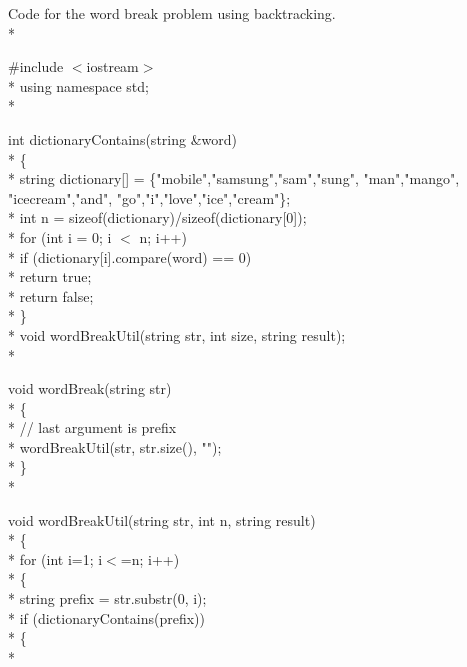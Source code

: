 \documentclass[12pt]{book}
\begin{document}
 Code for the word break problem using backtracking.\\*
 
 
$\#$include $<$iostream$>$\\*
using namespace std;\\*

int dictionaryContains(string \&word)\\*
\{\\*
\phantom{x} \hspace{3ex}    string dictionary[] = \{"mobile","samsung","sam","sung",
                            "man","mango", "icecream","and",
                            "go","i","love","ice","cream"\};\\*
\phantom{x} \hspace{3ex}    int n = sizeof(dictionary)/sizeof(dictionary[0]);\\*
\phantom{x} \hspace{3ex}    for (int i = 0; i $<$ n; i++)\\*
\phantom{x} \hspace{3ex} \phantom{x} \hspace{3ex}       if (dictionary[i].compare(word) == 0)\\*
\phantom{x} \hspace{3ex} \phantom{x} \hspace{3ex} \phantom{x} \hspace{3ex}          return true;\\*
\phantom{x} \hspace{3ex}    return false;\\*
\}\\*
void wordBreakUtil(string str, int size, string result);\\*

void wordBreak(string str)\\*
\{\\*
\phantom{x} \hspace{3ex}    // last argument is prefix\\*
\phantom{x} \hspace{3ex}    wordBreakUtil(str, str.size(), "");\\*
\}\\*

void wordBreakUtil(string str, int n, string result)\\*
\{\\*
\phantom{x} \hspace{3ex}    for (int i=1; i$<$=n; i++)\\*
 \phantom{x} \hspace{3ex}   \{\\*
\phantom{x} \hspace{3ex} \phantom{x} \hspace{3ex}       string prefix = str.substr(0, i);\\*
\phantom{x} \hspace{3ex} \phantom{x} \hspace{3ex}       if (dictionaryContains(prefix))\\*
\phantom{x} \hspace{3ex} \phantom{x} \hspace{3ex}       \{\\*
            
\end{document}

